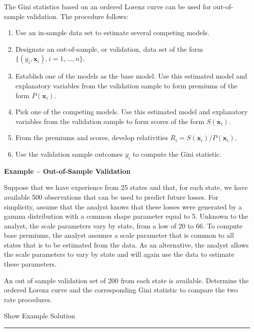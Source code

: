 \documentclass[]{book}
\providecommand{\tightlist}{%
  \setlength{\itemsep}{0pt}\setlength{\parskip}{0pt}}
\theoremstyle{definition}
\theoremstyle{definition}
\theoremstyle{definition}
\theoremstyle{remark}
\begin{document}
The Gini statistics based on an ordered Lorenz curve can be used for
out-of-sample validation. The procedure follows:

\begin{enumerate}
\def\labelenumi{\arabic{enumi}.}
\tightlist
\item
  Use an in-sample data set to estimate several competing models.
\item
  Designate an out-of-sample, or validation, data set of the form
  \(\{(y_i, \mathbf{x}_i), i=1,\ldots,n\}\).
\item
  Establish one of the models as the base model. Use this estimated
  model and explanatory variables from the validation sample to form
  premiums of the form \(P(\mathbf{x}_i)\).
\item
  Pick one of the competing models. Use this estimated model and
  explanatory variables from the validation sample to form scores of the
  form \(S(\mathbf{x}_i)\).
\item
  From the premiums and scores, develop relativities
  \(R_i =S(\mathbf{x}_i)/P(\mathbf{x}_i)\).
\item
  Use the validation sample outcomes \(y_i\) to compute the Gini
  statistic.
\end{enumerate}

\textbf{Example -- Out-of-Sample Validation}

Suppose that we have experience from 25 states and that, for each state,
we have available 500 observations that can be used to predict future
losses. For simplicity, assume that the analyst knows that these losses
were generated by a gamma distribution with a common shape parameter
equal to 5. Unknown to the analyst, the scale parameters vary by state,
from a low of 20 to 66. To compute base premiums, the analyst assumes a
scale parameter that is common to all states that is to be estimated
from the data. As an alternative, the analyst allows the scale
parameters to vary by state and will again use the data to estimate
these parameters.

An out of sample validation set of 200 from each state is available.
Determine the ordered Lorenz curve and the corresponding Gini statistic
to compare the two rate procedures.

Show Example Solution

\hypertarget{toggleExampleLor}{}
\begin{center}\rule{0.5\linewidth}{\linethickness}\end{center}
\end{document}
